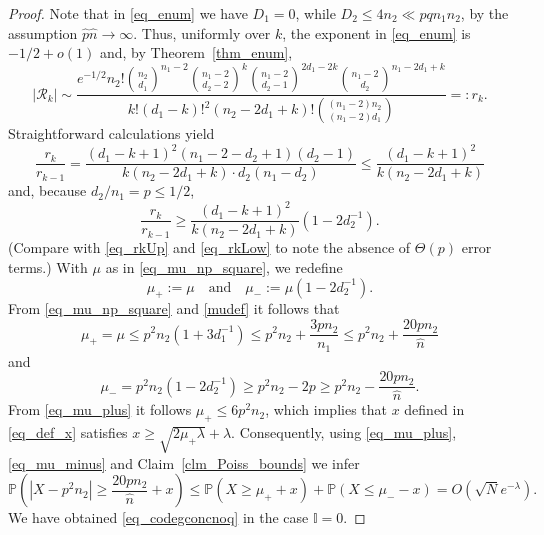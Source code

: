 \documentclass[12pt,reqno]{amsart}
\newcommand{\rc}{{\mathcal{R}}}
\newcommand{\Prob} {\mathbb {P}}
\newcommand{\prob}[1]{\Prob\left(#1\right)}
\newcommand{\I} {\mathbb I}
\theoremstyle{definition}
\begin{document}
\begin{proof}
Note that in \eqref{eq_enum} we have $D_1 = 0$, while $D_2 \le 4n_2 \ll pq n_1n_2$, by the assumption $\hat p\hat n\to\infty$.
Thus, uniformly over $k$, the exponent in \eqref{eq_enum} is $-1/2 + o(1)$ and, by Theorem~\ref{thm_enum},
\begin{equation*}
	|\rc_k| \sim
	\frac {e^{-1/2}n_2!\binom {n_2}{d_1}^{n_1 - 2} \binom {n_1 - 2}{d_{2} - 2}^{k}\binom {n_1 - 2}{d_{2} - 1}^{2d_1 - 2k}\binom {n_1 - 2}{d_{2}}^{n_1 - 2d_1 + k}} {k!(d_1 - k)!^2(n_2 - 2d_1 + k)!\binom{(n_1 - 2)n_2}{(n_1 - 2)d_1}} =: r_k.
\end{equation*}
Straightforward calculations yield
\begin{equation*}
\frac{r_k}{r_{k-1}} =
\frac {(d_1 - k + 1)^2(n_1 - 2 - d_2 + 1)(d_2 - 1)} {k(n_2 - 2d_1 + k)\cdot d_2(n_1 - d_2)} \le \frac{(d_1 - k + 1)^2}{k(n_2 - 2d_1 + k)}
\end{equation*}
and, because $d_2/n_1 = p\le1/2$,
\begin{equation*}
\frac{r_k}{r_{k-1}} \ge \frac{(d_1 - k + 1)^2}{k(n_2 - 2d_1 + k)}\left(1 - 2d_2^{-1} \right).
\end{equation*}
(Compare with \eqref{eq_rkUp} and \eqref{eq_rkLow} to note the absence of $\Theta(p)$ error terms.)
With  $\mu$ as in \eqref{eq_mu_np_square}, we redefine
\begin{equation}
  \label{mudef}
\mu_+ := \mu\quad\text{and}\quad\mu_- := \mu (1 - 2d_2^{-1}).
\end{equation}
From \eqref{eq_mu_np_square} and \eqref{mudef} it follows that
\begin{equation}
  \label{eq_mu_plus}
	\mu_{+} = \mu \le p^2n_2 (1 + 3d_1^{-1}) \le p^2n_2 + \frac{3pn_2}{n_1}\le p^2n_2 + \frac{20pn_2}{\hat n}
\end{equation}
and
\begin{equation}
	\label{eq_mu_minus}
	\mu_{-} = p^2n_2 (1 - 2d_2^{-1}) \ge p^2n_2 - 2p \ge  p^2n_2 - \frac{20pn_2}{\hat n}.
\end{equation}
From \eqref{eq_mu_plus} it follows $\mu_+ \le 6p^2n_2$, which implies that $x$ defined in \eqref{eq_def_x} satisfies $x \ge \sqrt{2\mu_+\lambda} + \lambda$.
Consequently, using \eqref{eq_mu_plus}, \eqref{eq_mu_minus} and Claim~\ref{clm_Poiss_bounds} we infer
\begin{equation*}
    \prob{|X - p^2n_2| \ge \frac{20pn_2}{\hat n} + x} \le \prob{X \ge \mu_+ + x} + \prob{X\le \mu_- - x} = O\left( \sqrt{N} e^{-\lambda} \right).
\end{equation*}
We have obtained \eqref{eq_codegconcnoq} in the case $\I = 0$.
\end{proof}
\end{document}
